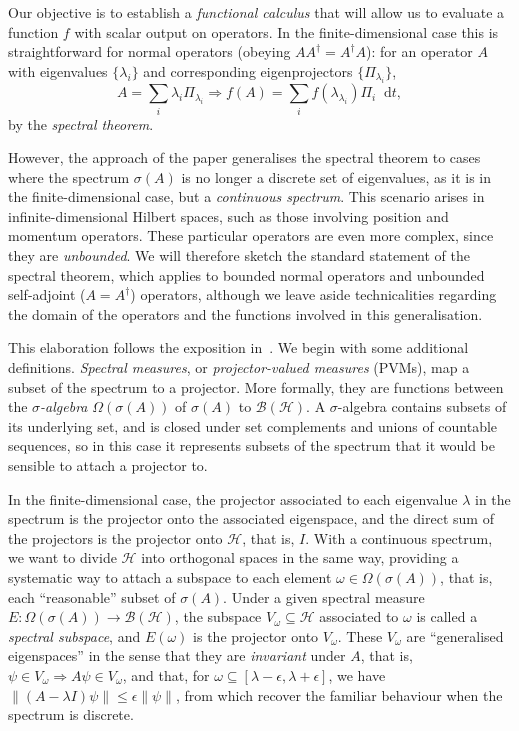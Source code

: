 \documentclass[10pt, a4paper]{article}
\numberwithin{equation}{section} %
\theoremstyle{definition}
\theoremstyle{plain}
\newcommand{\norm}[1]{\left\lVert#1\right\rVert}
\newcommand{\dif}{\mathop{}\!\mathrm{d}} %
\newcommand{\?}{\mathrel{?}} %
\newcommand{\Hs}{\mathcal{H}} %
\begin{document}
\begin{appendices}
      Our objective is to establish a \emph{functional calculus} that will allow us to evaluate a function  \(f\) with scalar output on operators. In the finite-dimensional case this is straightforward for normal operators (obeying \(AA^{\dagger} = A^{\dagger}A\)): for an operator \(A\) with eigenvalues \(\{\lambda_i\}\) and corresponding eigenprojectors \(\{\Pi_{\lambda_i}\}\),
      \[ A = \sum_i \lambda_i \Pi_{\lambda_i} \Rightarrow f(A) = \sum_i f(\lambda_{\lambda_i}) \Pi_i \dif{t}, \]
      by the \emph{spectral theorem}.

      However, the approach of the paper generalises the spectral theorem to cases where the spectrum \(\sigma(A)\) is no longer a discrete set of eigenvalues, as it is in the finite-dimensional case, but a \emph{continuous spectrum}. This scenario arises in infinite-dimensional Hilbert spaces, such as those involving position and momentum operators. These particular operators are even more complex, since they are \emph{unbounded}. We will therefore sketch the standard statement of the spectral theorem, which applies to bounded normal operators and unbounded self-adjoint (\(A = A^{\dagger}\)) operators, although we leave aside technicalities regarding the domain of the operators and the functions involved in this generalisation.

      This elaboration follows the exposition in~\cite{HallQuantumForMath}. We begin with some additional definitions. \emph{Spectral measures}, or \emph{projector-valued measures} (PVMs), map a subset of the spectrum to a projector. More formally, they are functions between the \emph{\(\sigma\)-algebra} \(\Omega(\sigma(A))\) of \(\sigma(A)\) to \(\mathcal{B}(\Hs)\). A \(\sigma\)-algebra contains subsets of its underlying set, and is closed under set complements and unions of countable sequences, so in this case it represents subsets of the spectrum that it would be sensible to attach a projector to.

      In the finite-dimensional case, the projector associated to each eigenvalue \(\lambda\) in the spectrum is the projector onto the associated eigenspace, and the direct sum of the projectors is the projector onto \(\Hs\), that is, \(I\). With a continuous spectrum, we want to divide \(\Hs\) into orthogonal spaces in the same way, providing a systematic way to attach a subspace to each element \(\omega \in \Omega(\sigma(A))\), that is, each ``reasonable'' subset of \(\sigma(A)\). Under a given spectral measure \(E : \Omega(\sigma(A)) \to \mathcal{B}(\Hs)\), the subspace \(V_{\omega} \subseteq \Hs\) associated to \(\omega\) is called a \emph{spectral subspace}, and \(E(\omega)\) is the projector onto \(V_{\omega}\). These \(V_{\omega}\) are ``generalised eigenspaces'' in the sense that they are \emph{invariant} under \(A\), that is, \(\psi \in V_{\omega} \Rightarrow A\psi \in V_{\omega}\), and that, for \(\omega \subseteq [\lambda - \epsilon, \lambda + \epsilon]\), we have \(\norm{(A - \lambda I)\psi} \leq \epsilon\norm{\psi}\), from which recover the familiar behaviour when the spectrum is discrete.


\end{appendices}
\end{document}
